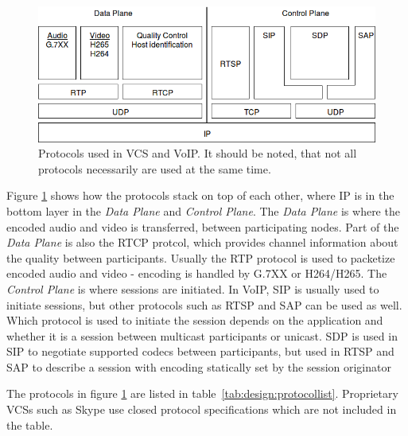 \begin{figure}[H]
	\centering
	\includegraphics[width=\textwidth]{figures/protocol_stack}
	\caption{Protocols used in VCS and VoIP. It should be noted, that not all protocols necessarily are used at the same time.}
	\label{fig:design:protocolstack}
\end{figure} 


Figure \ref{fig:design:protocolstack} shows how the protocols stack on top of each other, where IP is in the bottom layer in the \textit{Data Plane} and \textit{Control Plane}. The  \textit{Data Plane} is where the encoded audio and video is transferred, between participating nodes. Part of the \textit{Data Plane} is also the RTCP protcol, which provides channel information about the quality between participants. Usually the RTP protocol is used to packetize encoded audio and video - encoding is handled by G.7XX or H264/H265. The \textit{Control Plane} is where sessions are initiated. In VoIP, SIP is usually used to initiate sessions, but other protocols such as RTSP and SAP can be used as well. Which protocol is used to initiate the session depends on the application and whether it is a session between multicast participants or unicast. SDP is used in SIP to negotiate supported codecs between participants, but used in RTSP and SAP to describe a session with encoding statically set by the session originator\citep{voip_fundamentals}

The protocols in figure \ref{fig:design:protocolstack} are listed in table~\ref{tab:design:protocollist}. Proprietary VCSs such as Skype use closed protocol specifications which are not included in the table.


